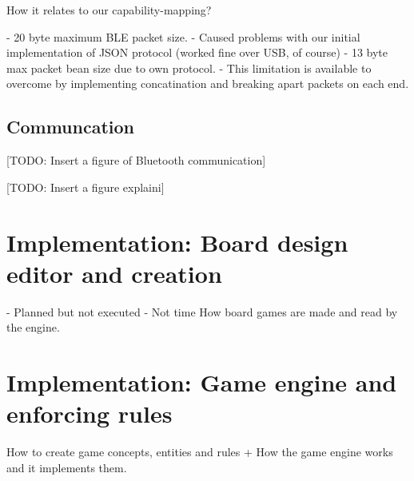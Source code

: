 How it relates to our capability-mapping?

- 20 byte maximum BLE packet size. 
- Caused problems with our initial implementation of JSON protocol (worked fine over USB, of course)
- 13 byte max packet bean size due to own protocol.
- This limitation is available to overcome by implementing concatination and breaking apart packets on each end.

\subsection{Communcation}
[TODO: Insert a figure of Bluetooth communication]

[TODO: Insert a figure explaini]

\section{Implementation: Board design editor and creation}
- Planned but not executed
- Not time
How board games are made and read by the engine.

\section{Implementation: Game engine and enforcing rules}

How to create game concepts, entities and rules + How the game engine works and it implements them. 

\newpage